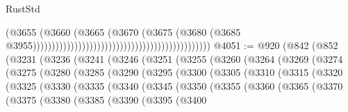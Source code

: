 \begin{lexlean}{RustStd}
\begin{coremodule}
{\begin{coremodule}
{{{{{{{{{{{{{{{{{{{{{{{{{{{{{{{{{{{{{{{{{{{{{{{{{{{{{{{                                                                                    (@3655
                                                                                      (@3660
                                                                                        (@3665
                                                                                          (@3670
                                                                                            (@3675
                                                                                              (@3680
                                                                                                (@3685
                                                                                                  @3955)))))))))))))))))))))))))))))))))))))))))))))))
@4051 := @920
    (@842
      (@852
        (@3231
          (@3236
            (@3241
              (@3246
                (@3251
                  (@3255
                    (@3260
                      (@3264
                        (@3269
                          (@3274
                            (@3275
                              (@3280
                                (@3285
                                  (@3290
                                    (@3295
                                      (@3300
                                        (@3305
                                          (@3310
                                            (@3315
                                              (@3320
                                                (@3325
                                                  (@3330
                                                    (@3335
                                                      (@3340
                                                        (@3345
                                                          (@3350
                                                            (@3355
                                                              (@3360
                                                                (@3365
                                                                  (@3370
                                                                    (@3375
                                                                      (@3380
                                                                        (@3385
                                                                          (@3390
                                                                            (@3395
                                                                              (@3400
}}}}}}}}}}}}}}}}}}}}}}}}}}}}}}}}}}}}}}}}}}}}}}}}}}}}}}}
\end{coremodule}}
\end{coremodule}
\end{lexlean}
